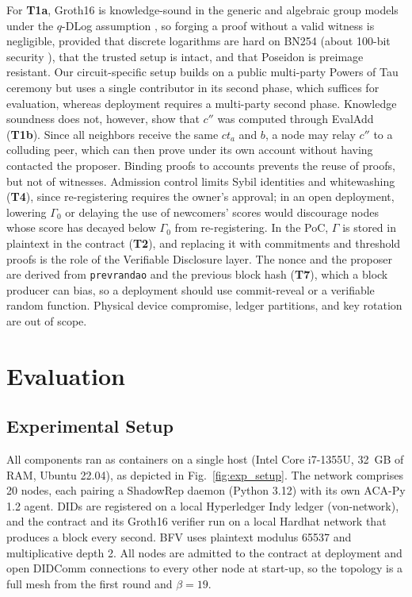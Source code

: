 \documentclass[conference]{IEEEtran}
\begin{document}
For \textbf{T1a}, Groth16 is knowledge-sound in the generic and algebraic group models under the $q$-DLog assumption \cite{groth2016size, fuchsbauer2018algebraic}, so forging a proof without a valid witness is negligible, provided that discrete logarithms are hard on BN254 (about 100-bit security \cite{kim2016extended}), that the trusted setup is intact, and that Poseidon is preimage resistant. Our circuit-specific setup builds on a public multi-party Powers of Tau ceremony but uses a single contributor in its second phase, which suffices for evaluation, whereas deployment requires a multi-party second phase. Knowledge soundness does not, however, show that $c''$ was computed through EvalAdd (\textbf{T1b}). Since all neighbors receive the same $\mathit{ct}_a$ and $b$, a node may relay $c''$ to a colluding peer, which can then prove under its own account without having contacted the proposer. Binding proofs to accounts prevents the reuse of proofs, but not of witnesses. Admission control limits Sybil identities and whitewashing (\textbf{T4}), since re-registering requires the owner's approval; in an open deployment, lowering $\Gamma_0$ or delaying the use of newcomers' scores would discourage nodes whose score has decayed below $\Gamma_0$ from re-registering. In the PoC, $\Gamma$ is stored in plaintext in the contract (\textbf{T2}), and replacing it with commitments and threshold proofs is the role of the Verifiable Disclosure layer. The nonce and the proposer are derived from \texttt{prevrandao} and the previous block hash (\textbf{T7}), which a block producer can bias, so a deployment should use commit-reveal or a verifiable random function. Physical device compromise, ledger partitions, and key rotation are out of scope.

\section{Evaluation}\label{sec:eval}

\subsection{Experimental Setup}\label{sec:experiments}
All components ran as containers on a single host (Intel Core i7-1355U, 32~GB of RAM, Ubuntu 22.04), as depicted in Fig.~\ref{fig:exp_setup}. The network comprises 20 nodes, each pairing a ShadowRep daemon (Python 3.12) with its own ACA-Py 1.2 agent. DIDs are registered on a local Hyperledger Indy ledger (von-network), and the contract and its Groth16 verifier run on a local Hardhat network that produces a block every second. BFV uses plaintext modulus 65537 and multiplicative depth 2. All nodes are admitted to the contract at deployment and open DIDComm connections to every other node at start-up, so the topology is a full mesh from the first round and $\beta = 19$.
\end{document}
